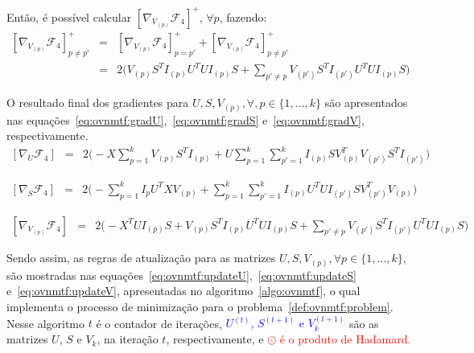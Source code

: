 \documentclass[
    12pt,                %
    oneside,            %
    a4paper,            %
    english,            %
    brazil                %
    ]{abntex2ppgsi}
\begin{document}
Então, é possível calcular $[\nabla_{V_{(p)}} \mathcal{F}_4]^{+}$, $\forall p$, fazendo:
\[
    \begin{array}{lcl}
        [\nabla_{V_{(p)}} \mathcal{F}_4]^{+}_{p \neq p'} & = & [\nabla_{V_{(p)}} \mathcal{F}_4]^{+}_{p = p'} + [\nabla_{V_{(p)}} \mathcal{F}_4]^{+}_{p \neq p'} \\
                                   & = & 2 \big( V_{(p)} S^T I_{(p)} U^T U I_{(p)} S + \sum_{p' \neq p} V_{(p')} S^T I_{(p')} U^T U I_{(p)} S \big)
    \end{array}
\]

O resultado final dos gradientes para $U, S, V_{(p)}, \forall, p \in \{1, \dots, k\}$ são apresentados nas equações~\ref{eq:ovnmtf:gradU},~\ref{eq:ovnmtf:gradS} e~\ref{eq:ovnmtf:gradV}, respectivamente.
\begin{equation}
\label{eq:ovnmtf:gradU}
    \begin{array}{lcl}
        [\nabla_U \mathcal{F}_4] & = & 2 \big( - X \sum_{p=1}^{k} V_{(p)} S^T I_{(p)} + U \sum_{p=1}^k \sum_{p'=1}^{k} I_{(p)} S V_{(p)}^T V_{(p')} S^T I_{(p')} \big)
    \end{array}
\end{equation}

\begin{equation}
\label{eq:ovnmtf:gradS}
    \begin{array}{lcl}
        [\nabla_S \mathcal{F}_4] & = & 2 \big( - \sum_{p=1}^{k} I_{p} U^T X V_{(p)} + \sum_{p=1}^{k} \sum_{p'=1}^{k} I_{(p)} U^T U I_{(p')} S V_{(p')}^T V_{(p)} \big)
    \end{array}
\end{equation}

\begin{equation}
\label{eq:ovnmtf:gradV}
    \begin{array}{lcl}
        [\nabla_{V_{(p)}} \mathcal{F}_4] & = & 2 \big( -X^T U I_{(p)} S + V_{(p)} S^T I_{(p)} U^T U I_{(p)} S + \sum_{p' \neq p}  V_{(p')} S^T I_{(p')} U^T U I_{(p)} S \big)
    \end{array}
\end{equation}

Sendo assim, as regras de atualização para as matrizes $U, S, V_{(p)}, \forall p \in \{1, \dots, k\}$, são mostradas nas equações~\ref{eq:ovnmtf:updateU},~\ref{eq:ovnmtf:updateS} e~\ref{eq:ovnmtf:updateV}, apresentadas no algoritmo~\ref{algo:ovnmtf}, o qual implementa o processo de minimização para o problema~\ref{def:ovnmtf:problem}. Nesse algoritmo $t$ é o contador de iterações, \textcolor{blue}{$U^{(t)}$, $S^{(t+1)}$ e $V_{k}^{(t+1)}$} são as matrizes $U$, $S$ e $V_{k}$, na iteração $t$, respectivamente, e \textcolor{red}{$\odot$ é o produto de Hadamard.}
\end{document}
